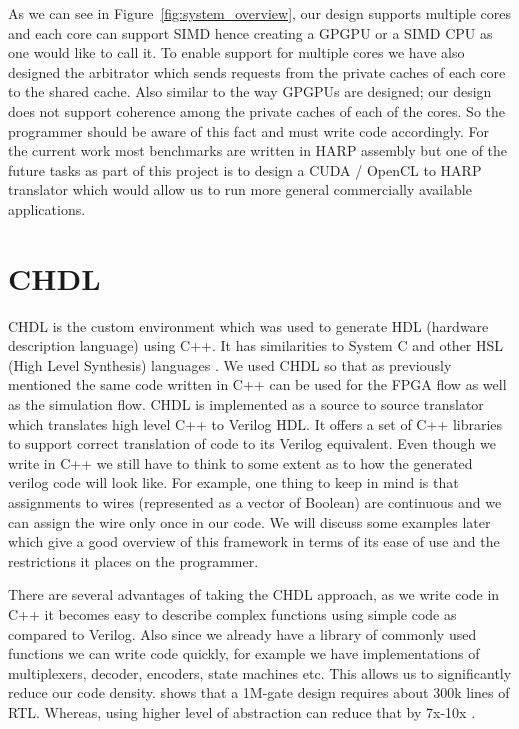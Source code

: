As we can see in Figure~\ref{fig:system_overview}, our design supports multiple cores and each core can support SIMD hence creating a GPGPU or a SIMD CPU as one would like to call it. To enable support for multiple cores we have also designed the arbitrator which sends requests from the private caches of each core to the shared cache. Also similar to the way GPGPUs are designed; our design does not support coherence among the private caches of each of the cores. So the programmer should be aware of this fact and must write code accordingly. For the current work most benchmarks are written in HARP assembly but one of the future tasks as part of this project is to design a CUDA / OpenCL to HARP translator which would allow us to run more general commercially available applications.
\section{ CHDL }
CHDL is the custom environment which was used to generate HDL (hardware description language) using C++. It has similarities to System C and other HSL (High Level Synthesis) languages \cite{hls_overview}. We used CHDL so that as previously mentioned the same code written in C++ can be used for the FPGA flow as well as the simulation flow. CHDL is implemented as a source to source translator which translates high level C++ to Verilog HDL. It offers a set of C++ libraries to support correct translation of code to its Verilog equivalent. Even though we write in C++ we still have to think to some extent as to how the generated verilog code will look like. For example, one thing to keep in mind is that assignments to wires (represented as a vector of Boolean) are continuous and we can assign the wire only once in our code. We will discuss some examples later which give a good overview of this framework in terms of its ease of use and the restrictions it places on the programmer.

There are several advantages of taking the CHDL approach, as we write code in C++ it becomes easy to describe complex functions using simple code as compared to Verilog. Also since we already have a library of commonly used functions we can write code quickly, for example we have implementations of multiplexers, decoder, encoders, state machines etc. This allows us to significantly reduce our code density. \cite{codedensity} shows that a 1M-gate design requires about 300k lines of RTL. Whereas, using higher level of abstraction can reduce that by 7x-10x \cite{hls_overview}.

